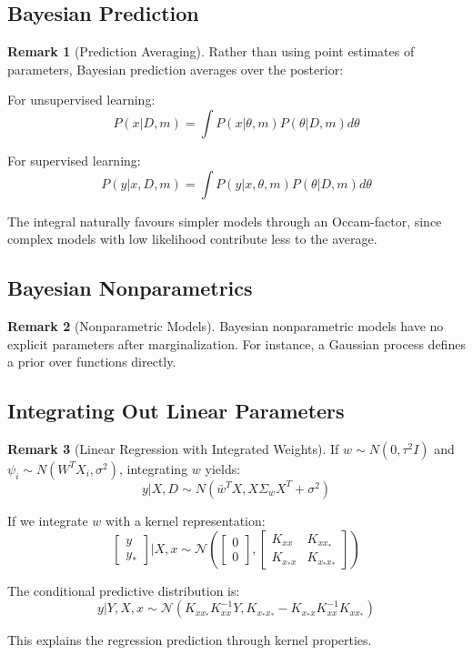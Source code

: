 \documentclass[12pt,a4paper]{article}
\theoremstyle{definition}
\newtheorem{remark}{Remark}[section]
\begin{document}
\subsection{Bayesian Prediction}

\begin{remark}[Prediction Averaging]
Rather than using point estimates of parameters, Bayesian prediction averages over the posterior:

For unsupervised learning:
\[
P(x | D, m) = \int P(x | \theta, m) P(\theta | D, m) d\theta
\]

For supervised learning:
\[
P(y | x, D, m) = \int P(y | x, \theta, m) P(\theta | D, m) d\theta
\]

The integral naturally favours simpler models through an Occam-factor, since complex models with low likelihood contribute less to the average.
\end{remark}

\subsection{Bayesian Nonparametrics}

\begin{remark}[Nonparametric Models]
Bayesian nonparametric models have no explicit parameters after marginalization. For instance, a Gaussian process defines a prior over functions directly.
\end{remark}

\subsection{Integrating Out Linear Parameters}

\begin{remark}[Linear Regression with Integrated Weights]
If $w \sim N(0, \tau^2 I)$ and $\psi_i \sim N(W^T X_i, \sigma^2)$, integrating $w$ yields:
\[
y | X, D \sim N(\bar{w}^T X, X \Sigma_w X^T + \sigma^2)
\]

If we integrate $w$ with a kernel representation:
\[
\begin{bmatrix} y \\ y_* \end{bmatrix} \bigg| X, x \sim \mathcal{N}\left(\begin{bmatrix} 0 \\ 0 \end{bmatrix}, \begin{bmatrix} K_{xx} & K_{xx_*} \\ K_{x_*x} & K_{x_*x_*} \end{bmatrix}\right)
\]

The conditional predictive distribution is:
\[
y | Y, X, x \sim \mathcal{N}(K_{xx_*} K_{xx}^{-1} Y, K_{x_*x_*} - K_{x_*x} K_{xx}^{-1} K_{xx_*})
\]

This explains the regression prediction through kernel properties.
\end{remark}
\end{document}
